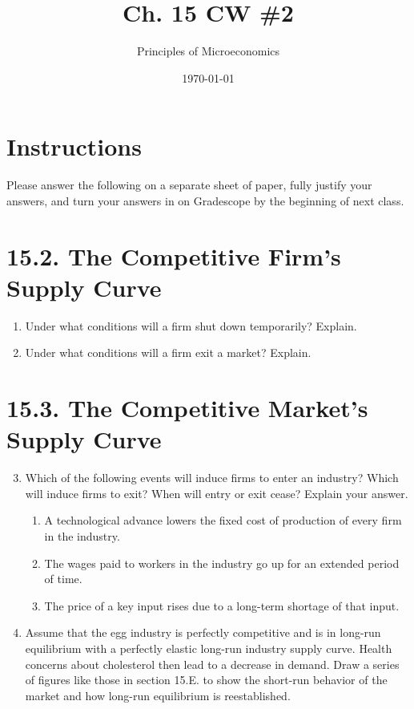 \documentclass{article}
\title{Ch. 15 CW \#2}
\author{Principles of Microeconomics}
\date{\today}
\begin{document}
\maketitle

\section*{Instructions}

Please answer the following on a separate sheet of paper, fully justify your answers, and turn your answers in on Gradescope by the beginning of next class. 

\section*{15.2. The Competitive Firm's Supply Curve}

\begin{enumerate}

\item Under what conditions will a firm shut down temporarily? Explain.

\item Under what conditions will a firm exit a market? Explain.

\end{enumerate}

\section*{15.3. The Competitive Market's Supply Curve}

\begin{enumerate}

\setcounter{enumi}{2}
\item Which of the following events will induce firms to enter an industry? Which will induce firms to exit? When will entry or exit cease? Explain your answer.

	\begin{enumerate}
	
	\item A technological advance lowers the fixed cost of production of every firm in the industry.
	
	\item The wages paid to workers in the industry go up for an extended period of time.
	
	\item The price of a key input rises due to a long-term shortage of that input.
	
	\end{enumerate}
	
\item Assume that the egg industry is perfectly competitive and is in long-run equilibrium with a perfectly elastic long-run industry supply curve. Health concerns about cholesterol then lead to a decrease in demand. Draw a series of figures like those in section 15.E. to show the short-run behavior of the market and how long-run equilibrium is reestablished. 

\end{enumerate}
\end{document}
